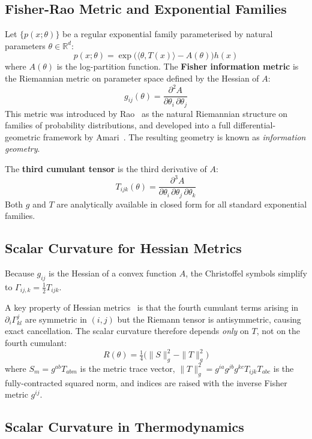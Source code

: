 \documentclass[12pt]{article}
\begin{document}
\subsection{Fisher-Rao Metric and Exponential Families}

Let $\{p(x;\theta)\}$ be a regular exponential family parameterised by natural
parameters $\theta \in \mathbb{R}^d$:
\[
  p(x;\theta) = \exp\bigl(\langle\theta, T(x)\rangle - A(\theta)\bigr) h(x)
\]
where $A(\theta)$ is the log-partition function. The \textbf{Fisher information
metric} is the Riemannian metric on parameter space defined by the Hessian of
$A$:
\[
  g_{ij}(\theta) = \frac{\partial^2 A}{\partial\theta_i\,\partial\theta_j}
\]
This metric was introduced by Rao~\cite{rao1945} as the natural Riemannian
structure on families of probability distributions, and developed into a full
differential-geometric framework by Amari~\cite{amari1985}. The resulting
geometry is known as \emph{information geometry}.

The \textbf{third cumulant tensor} is the third derivative of $A$:
\[
  T_{ijk}(\theta) = \frac{\partial^3 A}{\partial\theta_i\,\partial\theta_j\,\partial\theta_k}
\]
Both $g$ and $T$ are analytically available in closed form for all standard
exponential families.

\subsection{Scalar Curvature for Hessian Metrics}

Because $g_{ij}$ is the Hessian of a convex function $A$, the Christoffel
symbols simplify to $\Gamma_{ij,k} = \tfrac{1}{2}T_{ijk}$.

A key property of Hessian metrics~\cite{amari2000,ruppeiner1995} is that the
fourth cumulant terms arising in $\partial_i\Gamma^j_{kl}$ are symmetric in
$(i,j)$ but the Riemann tensor is antisymmetric, causing exact cancellation.
The scalar curvature therefore depends \emph{only} on $T$, not on the fourth
cumulant:
\[
  R(\theta) = \tfrac{1}{4}\bigl(\|S\|^2_g - \|T\|^2_g\bigr)
\]
where $S_m = g^{ab}T_{abm}$ is the metric trace vector,
$\|T\|^2_g = g^{ia}g^{jb}g^{kc}T_{ijk}T_{abc}$ is the fully-contracted squared
norm, and indices are raised with the inverse Fisher metric $g^{ij}$.

\subsection{Scalar Curvature in Thermodynamics}
\end{document}
